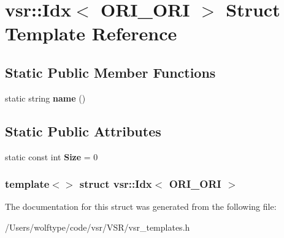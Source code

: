 \hypertarget{structvsr_1_1_idx_3_01_o_r_i___o_r_i_01_4}{\section{vsr\-:\-:Idx$<$ O\-R\-I\-\_\-\-O\-R\-I $>$ Struct Template Reference}
\label{structvsr_1_1_idx_3_01_o_r_i___o_r_i_01_4}
}
\subsection*{Static Public Member Functions}
\begin{DoxyCompactItemize}
\item 
\hypertarget{structvsr_1_1_idx_3_01_o_r_i___o_r_i_01_4_a235259055743efbe0523d593f2bff6ef}{static string {\bfseries name} ()}\label{structvsr_1_1_idx_3_01_o_r_i___o_r_i_01_4_a235259055743efbe0523d593f2bff6ef}

\end{DoxyCompactItemize}
\subsection*{Static Public Attributes}
\begin{DoxyCompactItemize}
\item 
\hypertarget{structvsr_1_1_idx_3_01_o_r_i___o_r_i_01_4_af4e16702bd3769bfc4933455497b09f7}{static const int {\bfseries Size} = 0}\label{structvsr_1_1_idx_3_01_o_r_i___o_r_i_01_4_af4e16702bd3769bfc4933455497b09f7}

\end{DoxyCompactItemize}
\subsubsection*{template$<$$>$ struct vsr\-::\-Idx$<$ O\-R\-I\-\_\-\-O\-R\-I $>$}



The documentation for this struct was generated from the following file\-:\begin{DoxyCompactItemize}
\item 
/\-Users/wolftype/code/vsr/\-V\-S\-R/vsr\-\_\-templates.\-h\end{DoxyCompactItemize}
